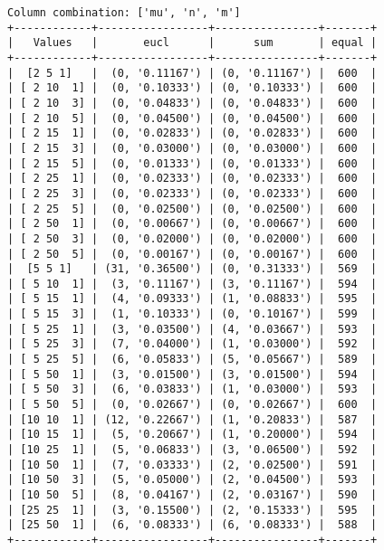 \documentclass{article}
\begin{document}
\begin{verbatim}
Column combination: ['mu', 'n', 'm']
+------------+-----------------+----------------+-------+
|   Values   |       eucl      |      sum       | equal |
+------------+-----------------+----------------+-------+
|  [2 5 1]   |  (0, '0.11167') | (0, '0.11167') |  600  |
| [ 2 10  1] |  (0, '0.10333') | (0, '0.10333') |  600  |
| [ 2 10  3] |  (0, '0.04833') | (0, '0.04833') |  600  |
| [ 2 10  5] |  (0, '0.04500') | (0, '0.04500') |  600  |
| [ 2 15  1] |  (0, '0.02833') | (0, '0.02833') |  600  |
| [ 2 15  3] |  (0, '0.03000') | (0, '0.03000') |  600  |
| [ 2 15  5] |  (0, '0.01333') | (0, '0.01333') |  600  |
| [ 2 25  1] |  (0, '0.02333') | (0, '0.02333') |  600  |
| [ 2 25  3] |  (0, '0.02333') | (0, '0.02333') |  600  |
| [ 2 25  5] |  (0, '0.02500') | (0, '0.02500') |  600  |
| [ 2 50  1] |  (0, '0.00667') | (0, '0.00667') |  600  |
| [ 2 50  3] |  (0, '0.02000') | (0, '0.02000') |  600  |
| [ 2 50  5] |  (0, '0.00167') | (0, '0.00167') |  600  |
|  [5 5 1]   | (31, '0.36500') | (0, '0.31333') |  569  |
| [ 5 10  1] |  (3, '0.11167') | (3, '0.11167') |  594  |
| [ 5 15  1] |  (4, '0.09333') | (1, '0.08833') |  595  |
| [ 5 15  3] |  (1, '0.10333') | (0, '0.10167') |  599  |
| [ 5 25  1] |  (3, '0.03500') | (4, '0.03667') |  593  |
| [ 5 25  3] |  (7, '0.04000') | (1, '0.03000') |  592  |
| [ 5 25  5] |  (6, '0.05833') | (5, '0.05667') |  589  |
| [ 5 50  1] |  (3, '0.01500') | (3, '0.01500') |  594  |
| [ 5 50  3] |  (6, '0.03833') | (1, '0.03000') |  593  |
| [ 5 50  5] |  (0, '0.02667') | (0, '0.02667') |  600  |
| [10 10  1] | (12, '0.22667') | (1, '0.20833') |  587  |
| [10 15  1] |  (5, '0.20667') | (1, '0.20000') |  594  |
| [10 25  1] |  (5, '0.06833') | (3, '0.06500') |  592  |
| [10 50  1] |  (7, '0.03333') | (2, '0.02500') |  591  |
| [10 50  3] |  (5, '0.05000') | (2, '0.04500') |  593  |
| [10 50  5] |  (8, '0.04167') | (2, '0.03167') |  590  |
| [25 25  1] |  (3, '0.15500') | (2, '0.15333') |  595  |
| [25 50  1] |  (6, '0.08333') | (6, '0.08333') |  588  |
+------------+-----------------+----------------+-------+
\end{verbatim}
\end{document}
